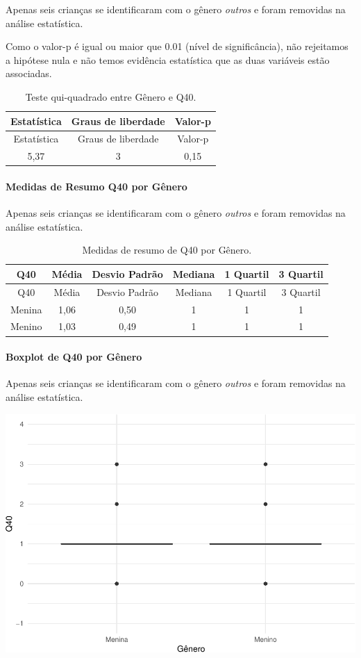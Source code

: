\documentclass[]{article}
\let\oldparagraph\paragraph
\renewcommand{\paragraph}[1]{\oldparagraph{#1}\mbox{}}
\begin{document}
Apenas seis crianças se identificaram com o gênero \emph{outros} e foram removidas na análise estatística.

Como o valor-p é igual ou maior que 0.01 (nível de significância), não rejeitamos a hipótese nula e não temos evidência estatística que as duas variáveis estão associadas.

\begin{longtable}[]{@{}ccc@{}}
\caption{\label{tab:unnamed-chunk-1560}Teste qui-quadrado entre Gênero e Q40.}\tabularnewline
\toprule
Estatística & Graus de liberdade & Valor-p\tabularnewline
\midrule
\endfirsthead
\toprule
Estatística & Graus de liberdade & Valor-p\tabularnewline
\midrule
\endhead
5,37 & 3 & 0,15\tabularnewline
\bottomrule
\end{longtable}

\cleardoublepage

\hypertarget{medidas-de-resumo-q40-por-guxeanero}{%
\paragraph{Medidas de Resumo Q40 por Gênero}\label{medidas-de-resumo-q40-por-guxeanero}}

Apenas seis crianças se identificaram com o gênero \emph{outros} e foram removidas na análise estatística.

\begin{longtable}[]{@{}cccccc@{}}
\caption{\label{tab:unnamed-chunk-1561}Medidas de resumo de Q40 por Gênero.}\tabularnewline
\toprule
Q40 & Média & Desvio Padrão & Mediana & 1 Quartil & 3 Quartil\tabularnewline
\midrule
\endfirsthead
\toprule
Q40 & Média & Desvio Padrão & Mediana & 1 Quartil & 3 Quartil\tabularnewline
\midrule
\endhead
Menina & 1,06 & 0,50 & 1 & 1 & 1\tabularnewline
Menino & 1,03 & 0,49 & 1 & 1 & 1\tabularnewline
\bottomrule
\end{longtable}

\hypertarget{boxplot-de-q40-por-guxeanero}{%
\paragraph{Boxplot de Q40 por Gênero}\label{boxplot-de-q40-por-guxeanero}}

Apenas seis crianças se identificaram com o gênero \emph{outros} e foram removidas na análise estatística.

\begin{center}\includegraphics[width=0.75\linewidth]{relatorio_covid19_files/figure-latex/unnamed-chunk-1562-1} \end{center}
\end{document}
